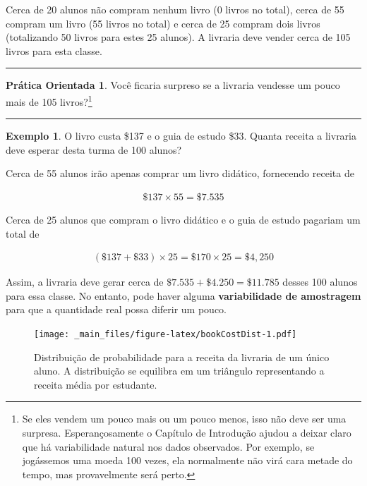 \documentclass[
]{book}
\theoremstyle{definition}
\theoremstyle{definition}
\newtheorem{example}{Exemplo}[chapter]
\theoremstyle{definition}
\newtheorem{exercise}{Prática Orientada}[chapter]
\theoremstyle{definition}
\theoremstyle{remark}
\begin{document}
Cerca de 20 alunos não compram nenhum livro (0 livros no total), cerca de 55 compram um livro (55 livros no total) e cerca de 25 compram dois livros (totalizando 50 livros para estes 25 alunos). A livraria deve vender cerca de 105 livros para esta classe.

\begin{center}\rule{0.5\linewidth}{0.5pt}\end{center}

\begin{exercise}
\protect\hypertarget{exr:unnamed-chunk-71}{}{\label{exr:unnamed-chunk-71} }Você ficaria surpreso se a livraria vendesse um pouco mais de 105 livros?\footnote{Se eles vendem um pouco mais ou um pouco menos, isso não deve ser uma surpresa. Esperançosamente o Capítulo de Introdução ajudou a deixar claro que há variabilidade natural nos dados observados. Por exemplo, se jogássemos uma moeda 100 vezes, ela normalmente não virá cara metade do tempo, mas provavelmente será perto.}
\end{exercise}

\begin{center}\rule{0.5\linewidth}{0.5pt}\end{center}

\begin{example}
\protect\hypertarget{exm:bookStoreRev}{}{\label{exm:bookStoreRev} }O livro custa \$137 e o guia de estudo \$33. Quanta receita a livraria deve esperar desta turma de 100 alunos?
\end{example}

Cerca de 55 alunos irão apenas comprar um livro didático, fornecendo receita de

\begin{eqnarray*}
\$137 \times  55 = \$7.535
\end{eqnarray*}

Cerca de 25 alunos que compram o livro didático e o guia de estudo pagariam um total de

\begin{eqnarray*}
(\$137 + \$33) \times  25 = \$170 \times  25 = \$4,250
\end{eqnarray*}

Assim, a livraria deve gerar cerca de \(\$7.535 + \$4.250 = \$11.785\) desses 100 alunos para essa classe. No entanto, pode haver alguma \textbf{variabilidade de amostragem} para que a quantidade real possa diferir um pouco.

\begin{figure}
\centering
\texttt{[image: \_main\_files/figure-latex/bookCostDist-1.pdf]}
\caption{\label{fig:bookCostDist}Distribuição de probabilidade para a receita da livraria de um único aluno. A distribuição se equilibra em um triângulo representando a receita média por estudante.}
\end{figure}
\end{document}
